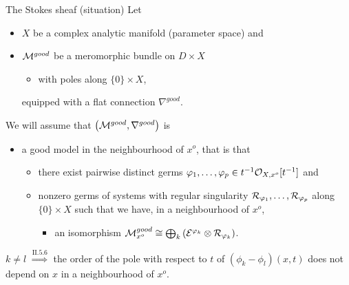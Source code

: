 \begin{frame}[t]{The Stokes sheaf (situation)}
  Let
  \begin{itemize}
    \item $X$ be a complex analytic manifold
      (\textcolor{green!40!black}{parameter space}) and
    \item $\mathcal{M}^{good}$ be a meromorphic bundle on $D\times X$
      \begin{itemize}
        \item with poles along $\{0\}\times X$,
      \end{itemize}
      equipped with a flat connection $\nabla^{good}$.
  \end{itemize}
  We will assume that $\left(\mathcal{M}^{good},\nabla^{good}\right)$ is 
  \begin{itemize}
    \item a good model in the neighbourhood of $x^o$, that is that
      \begin{itemize}
        \item there exist pairwise distinct germs $\varphi_1,\dots,\varphi_p\in
          t^{-1}\mathcal{O}_{X,x^o}[t^{-1}]$ and
        \item nonzero germs of systems with regular singularity
          $\mathcal{R}_{\varphi_1},\dots,\mathcal{R}_{\varphi_p}$ along $\{0\}\times X$ such that
              we have, in a neighbourhood of $x^o$,
          \begin{itemize}
            \item an isomorphism $\mathcal{M}_{x^o}^{good}
              \cong\bigoplus_k\left(\mathcal{E}^{\varphi_k}\otimes\mathcal{R}_{\varphi_k}\right)$.
          \end{itemize}
      \end{itemize}
  \end{itemize}
  $k\neq l$ $\overset{\text{II.5.6}}{\Rightarrow{}}$ the order of the pole with
  respect to $t$ of $(\phi_k-\phi_l)(x,t)$ does not depend on $x$ in a
  neighbourhood of $x^o$.
\end{frame}

